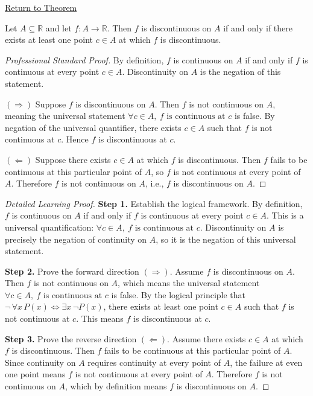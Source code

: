 \newpage
{}
\label{prf:discontinuity-on-set}

\begin{remark*}[Return]
\hyperref[prop:discontinuity-on-set]{Return to Theorem}
\end{remark*}

\begin{theorem*}
Let $A \subseteq \mathbb{R}$ and let $f : A \to \mathbb{R}$. Then $f$ is discontinuous on $A$ if and only if there exists at least one point $c \in A$ at which $f$ is discontinuous.
\end{theorem*}

\begin{proof}[Professional Standard Proof]
\LRAProofBodyStart
By definition, $f$ is continuous on $A$ if and only if $f$ is continuous at every point $c \in A$. Discontinuity on $A$ is the negation of this statement.

$(\Rightarrow)$ Suppose $f$ is discontinuous on $A$. Then $f$ is not continuous on $A$, meaning the universal statement $\forall c \in A,\ f \text{ is continuous at } c$ is false. By negation of the universal quantifier, there exists $c \in A$ such that $f$ is not continuous at $c$. Hence $f$ is discontinuous at $c$.

$(\Leftarrow)$ Suppose there exists $c \in A$ at which $f$ is discontinuous. Then $f$ fails to be continuous at this particular point of $A$, so $f$ is not continuous at every point of $A$. Therefore $f$ is not continuous on $A$, i.e., $f$ is discontinuous on $A$.
\end{proof}

\begin{proof}[Detailed Learning Proof]
\LRAProofBodyStart

\textbf{Step 1.} Establish the logical framework. By definition, $f$ is continuous on $A$ if and only if $f$ is continuous at every point $c \in A$. This is a universal quantification: $\forall c \in A,\ f \text{ is continuous at } c$. Discontinuity on $A$ is precisely the negation of continuity on $A$, so it is the negation of this universal statement.

\textbf{Step 2.} Prove the forward direction $(\Rightarrow)$. Assume $f$ is discontinuous on $A$. Then $f$ is not continuous on $A$, which means the universal statement $\forall c \in A,\ f \text{ is continuous at } c$ is false. By the logical principle that $\lnot\,\forall x\,P(x) \iff \exists x\,\lnot P(x)$, there exists at least one point $c \in A$ such that $f$ is not continuous at $c$. This means $f$ is discontinuous at $c$.

\textbf{Step 3.} Prove the reverse direction $(\Leftarrow)$. Assume there exists $c \in A$ at which $f$ is discontinuous. Then $f$ fails to be continuous at this particular point of $A$. Since continuity on $A$ requires continuity at every point of $A$, the failure at even one point means $f$ is not continuous at every point of $A$. Therefore $f$ is not continuous on $A$, which by definition means $f$ is discontinuous on $A$.
\end{proof}

